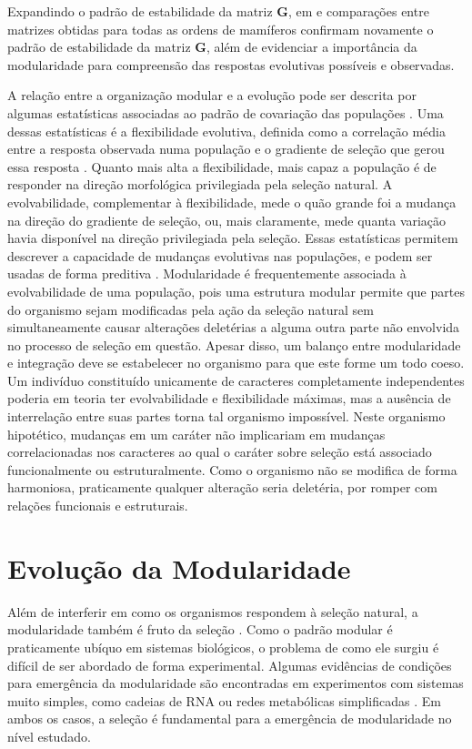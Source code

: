 Expandindo o padrão de estabilidade da matriz $\mathbf{G}$, em \cite{Porto2009} e
\cite{Marroig2009} comparações entre matrizes obtidas para todas as
ordens de mamíferos confirmam novamente o padrão de estabilidade da matriz
$\mathbf{G}$, além de evidenciar a importância da modularidade para compreensão das
respostas evolutivas possíveis e observadas.

A relação entre a organização modular e a evolução pode ser descrita por
algumas estatísticas associadas ao padrão de covariação das populações
\citep{Hansen2008}.
Uma dessas estatísticas é a flexibilidade evolutiva, definida como a
correlação média entre a resposta observada numa população e o gradiente
de seleção que gerou essa resposta \citep{Marroig2009}.
Quanto mais alta a flexibilidade, mais capaz a população é de responder
na direção morfológica privilegiada pela seleção natural.
A evolvabilidade, complementar à flexibilidade, mede o quão grande foi a
mudança na direção do gradiente de seleção, ou, mais claramente, mede
quanta variação havia disponível na direção privilegiada pela seleção.
Essas estatísticas permitem descrever a capacidade de mudanças evolutivas
nas populações, e podem ser usadas de forma preditiva
\citep[veja, por exemplo,][]{Marroig2010}.
Modularidade é frequentemente associada à evolvabilidade de uma
população, pois uma estrutura modular permite que partes do organismo sejam
modificadas pela ação da seleção natural sem simultaneamente causar
alterações deletérias a alguma outra parte não envolvida no processo de
seleção em questão.
Apesar disso, um balanço entre modularidade e integração deve se
estabelecer no organismo para que este forme um todo coeso.
Um indivíduo constituído unicamente de caracteres completamente
independentes poderia em teoria ter evolvabilidade e flexibilidade
máximas, mas a ausência de interrelação entre suas partes torna tal
organismo impossível.
Neste organismo hipotético, mudanças em um caráter não implicariam em
mudanças correlacionadas nos caracteres ao qual o caráter sobre seleção está
associado funcionalmente ou estruturalmente.
Como o organismo não se modifica de forma harmoniosa, praticamente
qualquer alteração seria deletéria, por romper com relações funcionais e
estruturais.


\section{Evolução da Modularidade}\label{intro:evolucao}

Além de interferir em como os organismos respondem à seleção natural, a
modularidade também é fruto da seleção \citep{Wagner1996, Wagner2007}.
Como o padrão modular é praticamente ubíquo em sistemas biológicos, o
problema de como ele surgiu é difícil de ser abordado de forma
experimental.
Algumas evidências de condições para emergência da modularidade são
encontradas em experimentos com sistemas muito simples, como cadeias de
RNA \citep{Ancel2000} ou redes metabólicas simplificadas
\citep{Espinosa-Soto2010}.
Em ambos os casos, a seleção é fundamental para a emergência
de modularidade no nível estudado.

